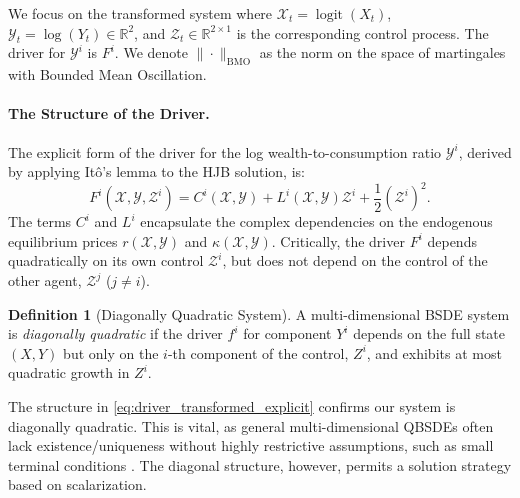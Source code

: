 \documentclass[11pt,letterpaper,oneside]{article}
\theoremstyle{plain}
\theoremstyle{definition}
\newtheorem{definition}[theorem]{Definition}
\theoremstyle{remark}
\begin{document}
\begin{tcolorbox}[colback=blue!5!white, colframe=blue!75!black, title={Notation for Transformed System}]
We focus on the transformed system where $\mathcal{X}_t = \operatorname{logit}(X_t)$, $\mathcal{Y}_t = \log(Y_t) \in \mathbb{R}^2$, and $\mathcal{Z}_t \in \mathbb{R}^{2\times 1}$ is the corresponding control process. The driver for $\mathcal{Y}^i$ is $F^i$. We denote $\|\cdot\|_{\mathrm{BMO}}$ as the norm on the space of martingales with Bounded Mean Oscillation.
\end{tcolorbox}

\paragraph{The Structure of the Driver.}
The explicit form of the driver for the log wealth-to-consumption ratio $\mathcal{Y}^i$, derived by applying Itô's lemma to the HJB solution, is:
\begin{equation}\label{eq:driver_transformed_explicit}
    F^i(\mathcal{X}, \mathcal{Y}, \mathcal{Z}^i) = C^i(\mathcal{X}, \mathcal{Y}) + L^i(\mathcal{X}, \mathcal{Y}) \mathcal{Z}^i + \frac{1}{2} (\mathcal{Z}^i)^2.
\end{equation}
The terms $C^i$ and $L^i$ encapsulate the complex dependencies on the endogenous equilibrium prices $r(\mathcal{X}, \mathcal{Y})$ and $\kappa(\mathcal{X}, \mathcal{Y})$. Critically, the driver $F^i$ depends quadratically on its own control $\mathcal{Z}^i$, but does not depend on the control of the other agent, $\mathcal{Z}^j$ ($j \neq i$).

\begin{definition}[Diagonally Quadratic System]
A multi-dimensional BSDE system is \emph{diagonally quadratic} if the driver $f^i$ for component $Y^i$ depends on the full state $(X, Y)$ but only on the $i$-th component of the control, $Z^i$, and exhibits at most quadratic growth in $Z^i$.
\end{definition}

The structure in \eqref{eq:driver_transformed_explicit} confirms our system is diagonally quadratic. This is vital, as general multi-dimensional QBSDEs often lack existence/uniqueness without highly restrictive assumptions, such as small terminal conditions \cite{Tevzadze2008}. The diagonal structure, however, permits a solution strategy based on scalarization.
\end{document}
